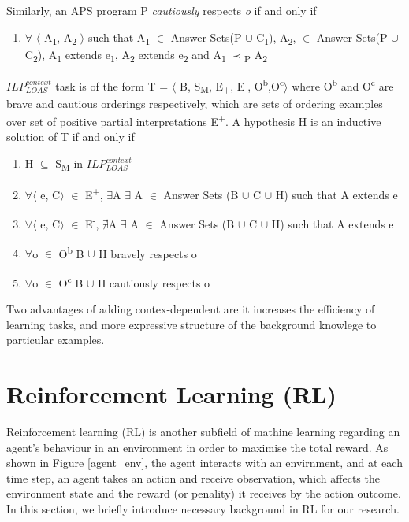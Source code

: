 \documentclass[12pt,twoside]{report}
\begin{document}
 Similarly, an APS program P \textit{cautiously} respects \textit{o} if and only if 
\begin{enumerate}
 \item $\forall$ $\langle$ A\textsubscript{1}, A\textsubscript{2} $\rangle$ such that A\textsubscript{1} $\in$ Answer Sets(P $\cup$ C\textsubscript{1}),  A\textsubscript{2}, $\in$ Answer Sets(P $\cup$ C\textsubscript{2}), A\textsubscript{1} extends e\textsubscript{1}, A\textsubscript{2} extends e\textsubscript{2} and A\textsubscript{1} $\prec$\textsubscript{P} A\textsubscript{2}
\end{enumerate}

$ILP_{LOAS}^{context}$ task is of the form T = $\langle$ B, S\textsubscript{M}, E\textsubscript{+}, E\textsubscript{-}, O\textsuperscript{b},O\textsuperscript{c}$\rangle$ where O\textsuperscript{b} and O\textsuperscript{c} are brave and cautious orderings respectively, which are sets of ordering examples over set of positive partial interpretations E\textsuperscript{+}.
A hypothesis H is an inductive solution of T if and only if 
\begin{enumerate}
\item H $\subseteq$ S\textsubscript{M} in $ILP_{LOAS}^{context}$
\item $\forall$$\langle$ e, C$\rangle$ $\in$ E\textsuperscript{+}, $\exists$A $\exists$ A $\in$ Answer Sets (B $\cup$ C $\cup$ H) such that A extends e 
\item $\forall$$\langle$ e, C$\rangle$ $\in$ E\textsuperscript{-}, $\nexists$A $\exists$ A $\in$ Answer Sets (B $\cup$ C $\cup$ H) such that A extends e 
\item $\forall$o $\in$ O\textsuperscript{b} B $\cup$ H bravely respects o
\item $\forall$o $\in$ O\textsuperscript{c} B $\cup$ H cautiously respects o
\end{enumerate}

Two advantages of adding contex-dependent are it increases the efficiency of learning tasks, and more expressive structure of the background knowlege to particular examples.

\section{Reinforcement Learning (RL)}
\label{rl}
Reinforcement learning (RL) is another subfield of mathine learning regarding an agent's behaviour in an environment in order to maximise the total reward. As shown in Figure \ref{agent_env}, the agent interacts with an envirnment, and at each time step, an agent takes an action and receive observation, which affects the environment state and the reward (or penality) it receives by the action outcome. In this section, we briefly introduce necessary background in RL for our research. 
\end{document}
